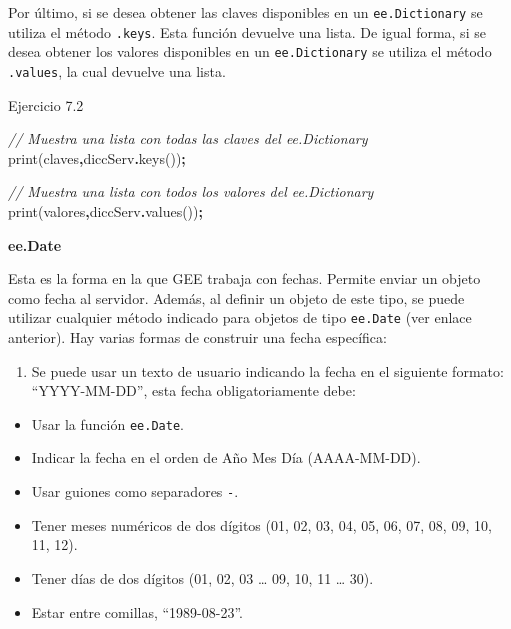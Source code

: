\documentclass[
  12pt,
  letterpaper,
  twoside]{book}
\newenvironment{Shaded}{\begin{snugshade}}{\end{snugshade}}
\newcommand{\CommentTok}[1]{\textcolor[rgb]{0.56,0.35,0.01}{\textit{#1}}}
\newcommand{\FunctionTok}[1]{\textcolor[rgb]{0.00,0.00,0.00}{#1}}
\newcommand{\NormalTok}[1]{#1}
\newcommand{\OperatorTok}[1]{\textcolor[rgb]{0.81,0.36,0.00}{\textbf{#1}}}
\newcommand{\StringTok}[1]{\textcolor[rgb]{0.31,0.60,0.02}{#1}}
\providecommand{\tightlist}{%
  \setlength{\itemsep}{0pt}\setlength{\parskip}{0pt}}
\begin{document}
Por último, si se desea obtener las claves disponibles en un \texttt{ee.Dictionary} se utiliza el método \texttt{.keys}. Esta función devuelve una lista. De igual forma, si se desea obtener los valores disponibles en un \texttt{ee.Dictionary} se utiliza el método \texttt{.values}, la cual devuelve una lista.

Ejercicio 7.2

\begin{Shaded}
\begin{Highlighting}[]
\CommentTok{// Muestra una lista con todas las claves del ee.Dictionary}
\FunctionTok{print}\NormalTok{(}\StringTok{\textquotesingle{}claves\textquotesingle{}}\OperatorTok{,}\NormalTok{diccServ}\OperatorTok{.}\FunctionTok{keys}\NormalTok{())}\OperatorTok{;}    

\CommentTok{// Muestra una lista con todos los valores del ee.Dictionary}
\FunctionTok{print}\NormalTok{(}\StringTok{\textquotesingle{}valores\textquotesingle{}}\OperatorTok{,}\NormalTok{diccServ}\OperatorTok{.}\FunctionTok{values}\NormalTok{())}\OperatorTok{;}  
\end{Highlighting}
\end{Shaded}

\textbf{ee.Date}

Esta es la forma en la que GEE trabaja con fechas. Permite enviar un objeto como fecha al servidor. Además, al definir un objeto de este tipo, se puede utilizar cualquier método indicado para objetos de tipo \texttt{ee.Date} (ver enlace anterior). Hay varias formas de construir una fecha específica:

\begin{enumerate}
\def\labelenumi{\arabic{enumi}.}
\tightlist
\item
  Se puede usar un texto de usuario indicando la fecha en el siguiente formato: ``YYYY-MM-DD'', esta fecha obligatoriamente debe:
\end{enumerate}

\begin{itemize}
\tightlist
\item
  Usar la función \texttt{ee.Date}.
\item
  Indicar la fecha en el orden de Año Mes Día (AAAA-MM-DD).
\item
  Usar guiones como separadores \texttt{-}.
\item
  Tener meses numéricos de dos dígitos (01, 02, 03, 04, 05, 06, 07, 08, 09, 10, 11, 12).
\item
  Tener días de dos dígitos (01, 02, 03 \ldots{} 09, 10, 11 \ldots{} 30).
\item
  Estar entre comillas, ``1989-08-23''.
\end{itemize}
\end{document}
